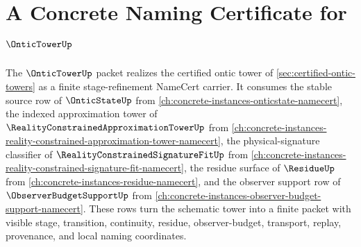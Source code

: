 \chapter{A Concrete Naming Certificate for $\OnticTowerUp$}
\label{ch:concrete-instances-ontic-tower-namecert}

The $\OnticTowerUp$ packet realizes the certified ontic tower of \autoref{sec:certified-ontic-towers} as a finite stage-refinement NameCert carrier. It consumes the stable source row of $\OnticStateUp$ from \autoref{ch:concrete-instances-onticstate-namecert}, the indexed approximation tower of $\RealityConstrainedApproximationTowerUp$ from \autoref{ch:concrete-instances-reality-constrained-approximation-tower-namecert}, the physical-signature classifier of $\RealityConstrainedSignatureFitUp$ from \autoref{ch:concrete-instances-reality-constrained-signature-fit-namecert}, the residue surface of $\ResidueUp$ from \autoref{ch:concrete-instances-residue-namecert}, and the observer support row of $\ObserverBudgetSupportUp$ from \autoref{ch:concrete-instances-observer-budget-support-namecert}. These rows turn the schematic tower into a finite packet with visible stage, transition, continuity, residue, observer-budget, transport, replay, provenance, and local naming coordinates.

